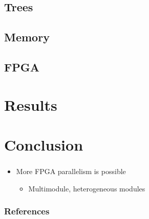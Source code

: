 \documentclass{beamer}
\begin{document}
\begin{frame}
	\frametitle{}
\end{frame}


\subsection{Trees}

\begin{frame}
	\frametitle{}
\end{frame}


\subsection{Memory}

\begin{frame}
	\frametitle{}
\end{frame}


\subsection{FPGA}

\begin{frame}
	\frametitle{}
\end{frame}


\section{Results}

\begin{frame}
	\frametitle{}
\end{frame}


\section{Conclusion}

\begin{frame}
	\frametitle{}
	\begin{itemize}
		\item More FPGA parallelism is possible
		\begin{itemize}
			\item Multimodule, heterogeneous modules
		\end{itemize}
	\end{itemize}
\end{frame}


\begin{frame}
	\frametitle{References}
	\printbibliography
\end{frame}
\end{document}
